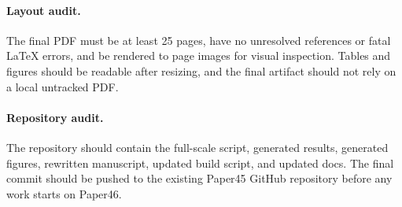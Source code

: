 \documentclass{article}
\begin{document}
\paragraph{Layout audit.}
The final PDF must be at least 25 pages, have no unresolved references or fatal LaTeX errors, and be rendered to page images for visual inspection. Tables and figures should be readable after resizing, and the final artifact should not rely on a local untracked PDF.

\paragraph{Repository audit.}
The repository should contain the full-scale script, generated results, generated figures, rewritten manuscript, updated build script, and updated docs. The final commit should be pushed to the existing Paper45 GitHub repository before any work starts on Paper46.
\end{document}
